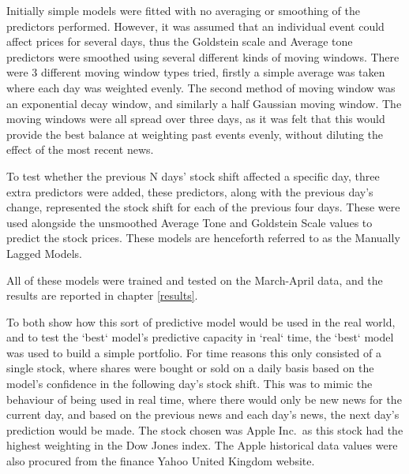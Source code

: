 Initially simple models were fitted with no averaging or smoothing of the predictors performed. However, it was assumed that an individual event could affect prices for several days, thus the Goldstein scale and Average tone predictors were smoothed using several different kinds of moving windows. There were 3 different moving window types tried, firstly a simple average was taken where each day was weighted evenly. The second method of moving window was an exponential decay window, and similarly a half Gaussian moving window. The moving windows were all spread over three days, as it was felt that this would provide the best balance at weighting past events evenly, without diluting the effect of the most recent news.

To test whether the previous N days' stock shift affected a specific day, three extra predictors were added, these predictors, along with the previous day's change, represented the stock shift for each of the previous four days. These were used alongside the unsmoothed Average Tone and Goldstein Scale values to predict the stock prices. These models are henceforth referred to as the Manually Lagged Models.

All of these models were trained and tested on the March-April data, and the results are reported in chapter \ref{results}.

To both show how this sort of predictive model would be used in the real world, and to test the `best` model's predictive capacity in `real` time, the `best` model was used to build a simple portfolio. For time reasons this only consisted of a single stock, where shares were bought or sold on a daily basis based on the model's confidence in the following day's stock shift. This was to mimic the behaviour of being used in real time, where there would only be new news for the current day, and based on the previous news and each day's news, the next day's prediction would be made. The stock chosen was Apple Inc.\ as this stock had the highest weighting in the Dow Jones index. The Apple historical data values were also procured from the finance Yahoo United Kingdom website. 

